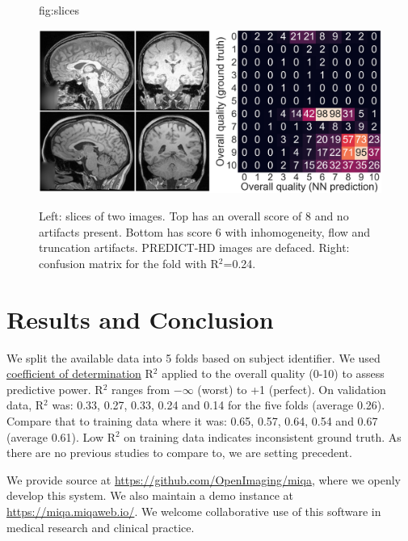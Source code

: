 \documentclass{midl} %
\begin{document}
\begin{figure}[ptb] %
\floatconts
  {fig:slices}
  {\caption{Left: slices of two images. Top has an overall score of 8 and no artifacts present. Bottom has score 6 with inhomogeneity, flow and truncation artifacts. PREDICT-HD images are defaced. Right: confusion matrix for the fold with R$^2$=0.24.}}
  {
  \includegraphics[width=0.99\linewidth]{figure.png}
  \vspace{-1.3\baselineskip} %
  }
\end{figure}

\section{Results and Conclusion}

We split the available data into 5 folds based on subject identifier. We used \href{https://en.wikipedia.org/wiki/Coefficient_of_determination}{coefficient of determination} R$^2$ applied to the overall quality (0-10) to assess predictive power.
R$^2$ ranges from $-\infty$ (worst) to +1 (perfect).
On validation data, R$^2$ was: 0.33, 0.27, 0.33, 0.24 and 0.14 for the five folds (average 0.26). Compare that to training data where it was: 0.65, 0.57, 0.64, 0.54 and 0.67 (average 0.61).
Low R$^2$ on training data indicates inconsistent ground truth.
As there are no previous studies to compare to, we are setting precedent.

We provide source at \url{https://github.com/OpenImaging/miqa}, where we openly develop this system. We also maintain a demo instance at \url{https://miqa.miqaweb.io/}.
We welcome collaborative use of this software in medical research and clinical practice.
\end{document}
